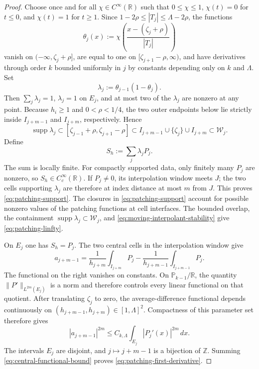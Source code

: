 \documentclass[11pt]{amsart}
\theoremstyle{plain}
\theoremstyle{definition}
\theoremstyle{remark}
\numberwithin{equation}{section}
\theoremstyle{plain}
\begin{document}
\begin{proof}
	Choose once and for all $\chi\in C^\infty(\mathbb R)$ such that
	$0\le\chi\le1$, $\chi(t)=0$ for $t\le0$, and $\chi(t)=1$ for $t\ge1$.
	Since $1-2\rho\le |T_j|\le\Lambda-2\rho$, the functions
	\[
		\theta_j(x)
		:=\chi\!\left(\frac{x-(\zeta_j+\rho)}{|T_j|}\right)
	\]
	vanish on $(-\infty,\zeta_j+\rho]$, are equal to one on
	$[\zeta_{j+1}-\rho,\infty)$, and have derivatives through order $k$
	bounded uniformly in $j$ by constants depending only on $k$ and $\Lambda$.
	Set
	\[
	\lambda_j:=\theta_{j-1}(1-\theta_j).
	\]
	Then $\sum_j\lambda_j=1$, $\lambda_j=1$ on $E_j$, and at most two of the
	$\lambda_j$ are nonzero at any point.
	Because $h_i\ge1$ and $0<\rho<1/4$, the two outer endpoints below lie
	strictly inside $I_{j+m-1}$ and $I_{j+m}$, respectively.  Hence
	\[
	\operatorname{supp}\lambda_j
	\subset[\zeta_{j-1}+\rho,\zeta_{j+1}-\rho]
	\subset I_{j+m-1}\cup\{\zeta_j\}\cup I_{j+m}
	\subset\mathcal W_j.
	\]
	Define
	\begin{equation}\label{eq:smooth-patched-function}
		S_h:=\sum_j\lambda_jP_j.
	\end{equation}
	The sum is locally finite.  For compactly supported data, only finitely many
	$P_j$ are nonzero, so $S_h\in C_c^\infty(\mathbb R)$.  If $P_j\ne0$, its
	interpolation window meets $J$; the two cells supporting $\lambda_j$ are
	therefore at index distance at most $m$ from $J$.  This proves
	\eqref{eq:patching-support}.
	The closures in \eqref{eq:patching-support} account for possible
	nonzero values of the patching functions at cell interfaces.  The bounded
	overlap, the containment
	$\operatorname{supp}\lambda_j\subset\mathcal W_j$, and
	\eqref{eq:moving-interpolant-stability} give
	\eqref{eq:patching-linfty}.
	
	On $E_j$ one has $S_h=P_j$.  The two central cells in the interpolation
	window give
	\begin{equation}\label{eq:central-cell-average-difference}
		a_{j+m-1}
		=
		\frac1{h_{j+m}}\int_{I_{j+m}}P_j
		-
		\frac1{h_{j+m-1}}\int_{I_{j+m-1}}P_j.
	\end{equation}
	The functional on the right vanishes on constants.  On
	$\mathbb P_{k-1}/\mathbb R$, the quantity
	$\|P'\|_{L^{2m}(E_j)}$ is a norm and therefore controls every linear
	functional on that quotient.  After translating $\zeta_j$ to zero, the
	average-difference functional depends continuously on
	$(h_{j+m-1},h_{j+m})\in[1,\Lambda]^2$.  Compactness of this parameter set
	therefore gives
	\begin{equation}\label{eq:central-functional-bound}
		|a_{j+m-1}|^{2m}
		\le C_{k,\Lambda}
		\int_{E_j}|P_j'(x)|^{2m}\,dx.
	\end{equation}
	The intervals $E_j$ are disjoint, and $j\mapsto j+m-1$ is a bijection of
	$\mathbb Z$.  Summing \eqref{eq:central-functional-bound} proves
	\eqref{eq:patching-first-derivative}.
	

\end{proof}
\end{document}
